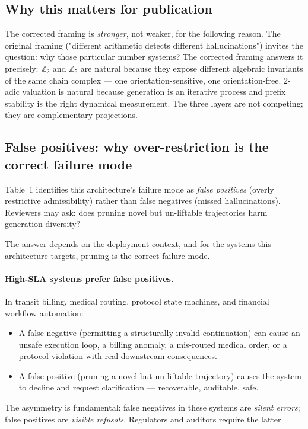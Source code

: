 \documentclass[11pt,a4paper]{article}
\begin{document}
\subsection*{Why this matters for publication}

The corrected framing is \emph{stronger}, not weaker, for the following reason.
The original framing ("different arithmetic detects different hallucinations")
invites the question: why those particular number systems?
The corrected framing answers it precisely: $\mathbb{Z}_2$ and $\mathbb{Z}_5$
are natural because they expose different algebraic invariants of the same
chain complex --- one orientation-sensitive, one orientation-free.
2-adic valuation is natural because generation is an iterative process
and prefix stability is the right dynamical measurement.
The three layers are not competing; they are complementary projections.

\subsection{False positives: why over-restriction is the correct failure mode}

Table~1 identifies this architecture's failure mode as
\emph{false positives} (overly restrictive admissibility) rather than
false negatives (missed hallucinations).
Reviewers may ask: does pruning novel but un-liftable trajectories
harm generation diversity?

The answer depends on the deployment context, and for the systems
this architecture targets, pruning is the correct failure mode.

\paragraph{High-SLA systems prefer false positives.}
In transit billing, medical routing, protocol state machines, and
financial workflow automation:
\begin{itemize}
  \item A false negative (permitting a structurally invalid continuation)
        can cause an unsafe execution loop, a billing anomaly, a
        mis-routed medical order, or a protocol violation with
        real downstream consequences.
  \item A false positive (pruning a novel but un-liftable trajectory)
        causes the system to decline and request clarification ---
        recoverable, auditable, safe.
\end{itemize}
The asymmetry is fundamental: false negatives in these systems are
\emph{silent errors}; false positives are \emph{visible refusals}.
Regulators and auditors require the latter.
\end{document}
